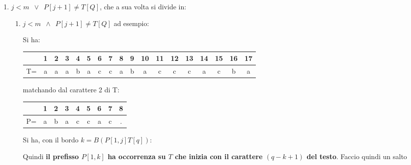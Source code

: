 \documentclass[a4paper,12pt, oneside]{book}
\begin{document}
\begin{enumerate}
  \item $j<m\,\,\,\lor\,\,\,P[j+1]\neq T[Q]$, che a sua volta si divide in:
  \begin{enumerate}
    \item $j<m\,\,\,\land\,\,\,P[j+1]\neq T[Q]$ ad esempio:
    \begin{esempio}
      Si ha:
      \begin{table}[H]
        \centering
        \begin{tabular}{c||c|c|c|c|c|c|c|c|c|c|c|c|c|c|c|c|c}
          \hline
          & 1 & 2 & 3 & 4 & 5 & 6 & 7 & 8 & 9 & 10 & 11 & 12 & 13 &14&15&16&17\\
          \hline
          T=&a& a & a& b& a& c &c &a &b &a&c&c&c&a &c &b &a\\
          \hline
        \end{tabular}
      \end{table}
      matchando dal carattere 2 di T:

      \begin{table}[H]
        \centering
        \begin{tabular}{c||c|c|c|c|c|c|c|c}
          \hline
          & 1 & 2 & 3 & 4 & 5 & 6 & 7 & 8\\
          \hline
          P=&a& b & a& c& c&a&c &. \\
          \hline
        \end{tabular}
      \end{table}
    \end{esempio}
    Si ha, con il bordo $k=B(P[1,j]T[q])$:
    \begin{center}
    \end{center}
    Quindi \textbf{il prefisso $P[1,k]$ ha occorrenza su $T$ che inizia con il
      carattere $(q-k+1)$ del testo}. Faccio quindi un salto


\end{enumerate}
\end{enumerate}
\end{document}
